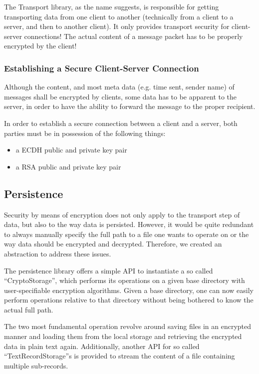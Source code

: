 The Transport library, as the name suggests, is responsible for getting transporting data from one client to another (technically from a client to a server, and then to another client).
It only provides transport security for client-server connections!
The actual content of a message packet has to be properly encrypted by the client!

\subsubsection{Establishing a Secure Client-Server Connection}
Although the content, and most meta data (e.g. time sent, sender name) of messages shall be encrypted by clients, some data has to be apparent to the server, in order to have the ability to forward the message to the proper recipient.

In order to establish a secure connection between a client and a server, both parties must be in possession of the following things:
\begin{itemize}
  \item a \ac{ECDH} public and private key pair
  \item a RSA public and private key pair
\end{itemize}


\subsection{Persistence}\label{subsec:persistence}
Security by means of encryption does not only apply to the transport step of data, but also to the way data is persisted.
However, it would be quite redundant to always manually specify the full path to a file one wants to operate on or the way data should be encrypted and decrypted.
Therefore, we created an abstraction to address these issues.

The persistence library offers a simple API to instantiate a so called \enquote{CryptoStorage}, which performs its operations on a given base directory with user-specifiable encryption algorithms.
Given a base directory, one can now easily perform operations relative to that directory without being bothered to know the actual full path.

The two most fundamental operation revolve around saving files in an encrypted manner and loading them from the local storage and retrieving the encrypted data in plain text again.
Additionally, another API for so called \enquote{TextRecordStorage}s is provided to stream the content of a file containing multiple sub-records.

